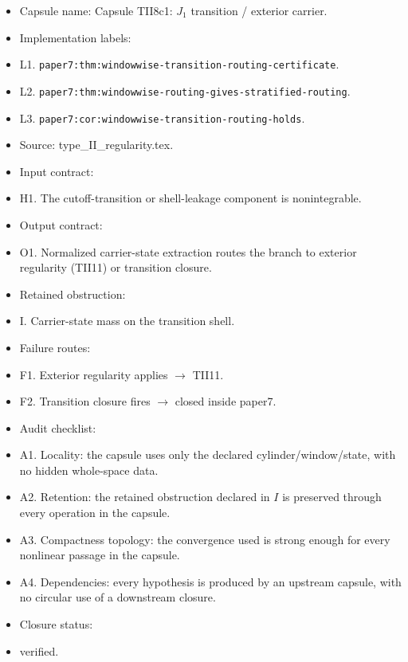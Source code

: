 \documentclass[11pt]{amsart}
\begin{document}
\begin{itemize}
  \item Capsule name: Capsule TII8c1: $J_1$ transition / exterior carrier.
  \item Implementation labels:
  \item L1. \texttt{paper7:thm:windowwise-transition-routing-certificate}.
  \item L2. \texttt{paper7:thm:windowwise-routing-gives-stratified-routing}.
  \item L3. \texttt{paper7:cor:windowwise-transition-routing-holds}.
  \item Source: type\_II\_regularity.tex.
  \item Input contract:
  \item H1. The cutoff-transition or shell-leakage component is nonintegrable.
  \item Output contract:
  \item O1. Normalized carrier-state extraction routes the branch to exterior regularity (TII11) or transition closure.
  \item Retained obstruction:
  \item I. Carrier-state mass on the transition shell.
  \item Failure routes:
  \item F1. Exterior regularity applies $\to$ TII11.
  \item F2. Transition closure fires $\to$ closed inside paper7.
  \item Audit checklist:
  \item A1. Locality: the capsule uses only the declared cylinder/window/state, with no hidden whole-space data.
  \item A2. Retention: the retained obstruction declared in $I$ is preserved through every operation in the capsule.
  \item A3. Compactness topology: the convergence used is strong enough for every nonlinear passage in the capsule.
  \item A4. Dependencies: every hypothesis is produced by an upstream capsule, with no circular use of a downstream closure.
  \item Closure status:
  \item verified.
\end{itemize}
\end{document}
